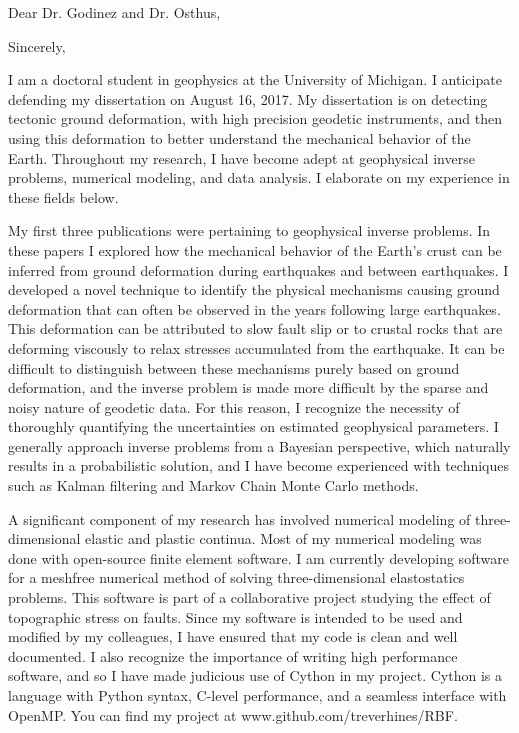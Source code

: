 \documentclass[11pt,a4paper,sans]{moderncv}
\begin{document}
\recipient{\ }{}
\date{July 24, 2017}
\opening{Dear Dr. Godinez and Dr. Osthus,}
\closing{Sincerely,}
\makelettertitle

I am a doctoral student in geophysics at the University of Michigan. I anticipate defending my dissertation on August 16, 2017. My dissertation is on detecting tectonic ground deformation, with high precision geodetic instruments, and then using this deformation to better understand the mechanical behavior of the Earth. Throughout my research, I have become adept at geophysical inverse problems, numerical modeling, and data analysis. I elaborate on my experience in these fields below.

My first three publications were pertaining to geophysical inverse problems. In these papers I explored how the mechanical behavior of the Earth's crust can be inferred from ground deformation during earthquakes and between earthquakes. I developed a novel technique to identify the physical mechanisms causing ground deformation that can often be observed in the years following large earthquakes. This deformation can be attributed to slow fault slip or to crustal rocks that are deforming viscously to relax stresses accumulated from the earthquake. It can be difficult to distinguish between these mechanisms purely based on ground deformation, and the inverse problem is made more difficult by the sparse and noisy nature of geodetic data. For this reason, I recognize the necessity of thoroughly quantifying the uncertainties on estimated geophysical parameters. I generally approach inverse problems from a Bayesian perspective, which naturally results in a probabilistic solution, and I have become experienced with techniques such as Kalman filtering and Markov Chain Monte Carlo methods.   

A significant component of my research has involved numerical modeling of three-dimensional elastic and plastic continua. Most of my numerical modeling was done with open-source finite element software. I am currently developing software for a meshfree numerical method of solving three-dimensional elastostatics problems. This software is part of a collaborative project studying the effect of topographic stress on faults. Since my software is intended to be used and modified by my colleagues, I have ensured that my code is clean and well documented. I also recognize the importance of writing high performance software, and so I have made judicious use of Cython in my project. Cython is a language with Python syntax, C-level performance, and a seamless interface with OpenMP. You can find my project at www.github.com/treverhines/RBF.
\end{document}
